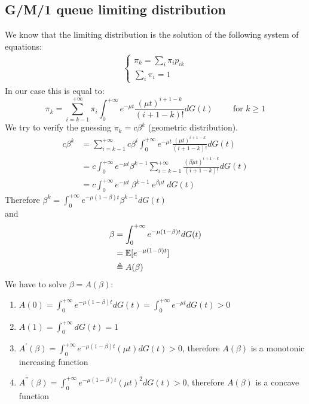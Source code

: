 	\subsection{G/M/1 queue limiting distribution}
	We know that the limiting distribution is the solution of the following system of equations:
	\begin{equation*}
		\begin{split}
			\begin{cases}
				\pi_k = \sum_i \pi_i p_{ik} \\
				\sum_i \pi_i = 1
			\end{cases}
		\end{split}
	\end{equation*}
	In our case this is equal to:
	$$\pi_k = \sum_{i = k-1}^{+\infty} \pi_i \int_0^{+\infty}e^{-\mu t} \frac{(\mu t)^{i+1-k}}{(i+1-k)!}dG(t) \hspace{1cm} \text{for } k \geq 1$$
	We try to verify the guessing $\pi_k=c\beta^k$ (geometric distribution).
	\begin{equation*}
		\begin{split}
			c\beta^k &= \sum_{i = k-1}^{+\infty} c\beta^i \int_0^{+\infty}e^{-\mu t} \frac{(\mu t)^{i+1-k}}{(i+1-k)!}dG(t) \\
			&= c \int_0^{+\infty}e^{-\mu t}\beta^{k-1}\sum_{i = k-1}^{+\infty}\frac{(\beta \mu t)^{i+1-k}}{(i+1-k)!}dG(t) \\
			&= c \int_0^{+\infty}e^{-\mu t}~\beta^{k-1}~ e^{\beta \mu t}~dG(t)
		\end{split}
	\end{equation*}
	Therefore $\beta^k = \int_0^{+\infty}e^{-\mu(1-\beta)t}\beta^{k-1}dG(t)$\\
	and
	\begin{equation*}
		\begin{split}
			\beta &= \int_0^{+\infty}e^{-\mu(1-\beta)t}dG(t)\\
			&= \mathbb{E}[e^{-\mu(1-\beta)t}]\\
			&\triangleq A(\beta)
		\end{split}
	\end{equation*}
	We have to solve $\beta = A(\beta)$: %
	\begin{enumerate}
		\item $A(0) = \int_0^{+\infty}e^{-\mu(1-\beta)t}dG(t)=\int_0^{+\infty}e^{-\mu t}dG(t) > 0$
		\item $A(1) =\int_0^{+\infty}dG(t)= 1 $
		\item $A^{'}(\beta)=\int_0^{+\infty}e^{-\mu(1-\beta)t}(\mu t)dG(t) > 0$, therefore $A(\beta)$ is a monotonic increasing function
		\item $A^{''}(\beta)=\int_0^{+\infty}e^{-\mu(1-\beta)t}(\mu t)^2dG(t) > 0$, therefore $A(\beta)$ is a concave function
	\end{enumerate}
